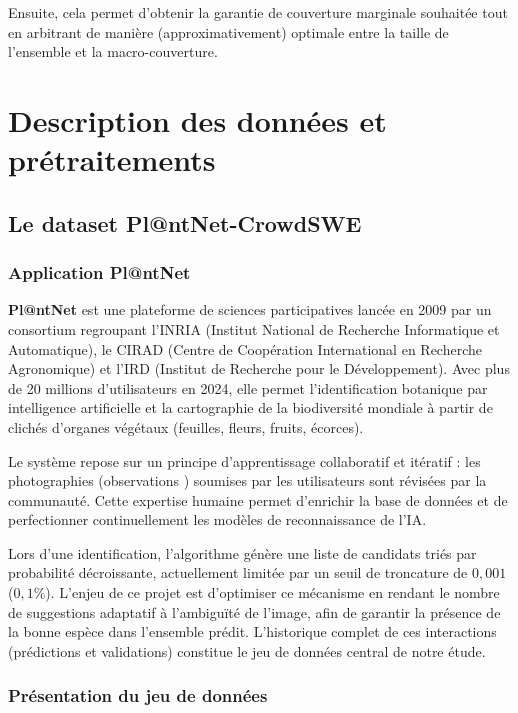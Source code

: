 \documentclass[12pt,a4paper]{article}
\begin{document}
\noindent Ensuite, cela permet d'obtenir la garantie de couverture marginale souhaitée tout en arbitrant de manière (approximativement) optimale entre la taille de l'ensemble et la macro-couverture. 




\section{Description des données et prétraitements}

\subsection{Le dataset Pl@ntNet-CrowdSWE}

\subsubsection{Application Pl@ntNet}

\textbf{Pl@ntNet} est une plateforme de sciences participatives lancée en 2009 par un consortium regroupant l'INRIA (Institut National de Recherche Informatique et Automatique), le CIRAD (Centre de Coopération International en Recherche Agronomique) et l'IRD (Institut de Recherche pour le Développement). Avec plus de 20 millions d'utilisateurs en 2024, elle permet l'identification botanique par intelligence artificielle et la cartographie de la biodiversité mondiale à partir de clichés d'organes végétaux (feuilles, fleurs, fruits, écorces).

Le système repose sur un principe d'apprentissage collaboratif et itératif : les photographies (\og observations \fg{}) soumises par les utilisateurs sont révisées par la communauté. Cette expertise humaine permet d'enrichir la base de données et de perfectionner continuellement les modèles de reconnaissance de l'IA.

Lors d'une identification, l'algorithme génère une liste de candidats triés par probabilité décroissante, actuellement limitée par un seuil de troncature de $0{,}001$ ($0{,}1\%$). L'enjeu de ce projet est d'optimiser ce mécanisme en rendant le nombre de suggestions adaptatif à l'ambiguïté de l'image, afin de garantir la présence de la bonne espèce dans l'ensemble prédit. L'historique complet de ces interactions (prédictions et validations) constitue le jeu de données central de notre étude.




\subsubsection{Présentation du jeu de données}
\label{subsec:jeu_donnees}
\end{document}
